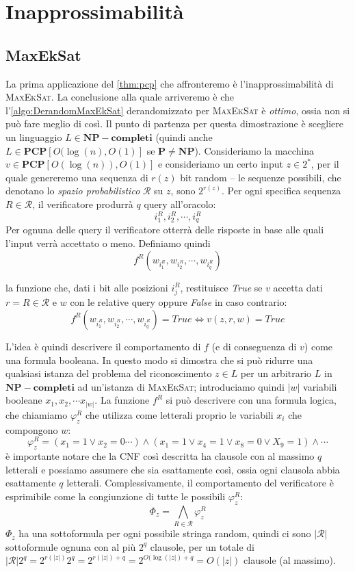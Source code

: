 \section{Inapprossimabilità}
\subsection{MaxEkSat}
La prima applicazione del \cref{thm:pcp} che affronteremo è l'inapprossimabilità di
\textsc{MaxEkSat}. La conclusione alla quale arriveremo è che l'\cref{algo:DerandomMaxEkSat} derandomizzato
per \textsc{MaxEkSat} è \textit{ottimo}, ossia non si può fare meglio di così.
Il punto di partenza per questa dimostrazione è scegliere un linguaggio
$L \in \mathbf{NP-completi}$ (quindi anche $L \in \mathbf{PCP}[O(\log(n), O(1)]$ se $\mathbf{P} \neq \mathbf{NP}$).
Consideriamo la macchina $v \in \mathbf{PCP}[O(\log(n)), O(1)]$ e consideriamo un
certo input $z \in 2^*$, per il quale genereremo una sequenza
di $r(z)$ bit random -- le sequenze possibili, che denotano lo \textit{spazio probabilistico}
$\mathcal{R}$ su $z$, sono $2^{r(z)}$.
Per ogni specifica sequenza $R \in \mathcal{R}$, il verificatore produrrà $q$ query all'oracolo:
$$
	i_{1}^R, i_{2}^R, \cdots, i_{q}^R
$$
Per ognuna delle query il verificatore otterrà delle risposte in base alle
quali l'input verrà accettato o meno. Definiamo quindi
$$
	f^R(w_{i_{1}^R}, w_{i_{2}^R}, \cdots, w_{i_{q}^R})
$$

la funzione che, dati i bit alle posizioni $i_{j}^R$, restituisce \textit{True} se $v$
accetta dati $r = R \in \mathcal{R}$ e $w$ con le relative query oppure \textit{False}
in caso contrario:
$$
	f^R(w_{i_{1}^R}, w_{i_{2}^R}, \cdots, w_{i_{q}^R}) = True \iff v(z, r, w) = True
$$

L'idea è quindi descrivere il comportamento di $f$ (e di conseguenza di $v$) come una
formula booleana. In questo modo si dimostra che si può ridurre una qualsiasi istanza
del problema del riconoscimento $z \in L$ per un arbitrario $L$ in $\mathbf{NP-completi}$
ad un'istanza di \textsc{MaxEkSat};
introduciamo quindi $|w|$ variabili booleane $x_1, x_2, \cdots x_{|w|}$.
La funzione $f^R$ si può descrivere con una formula logica, che chiamiamo
$\varphi^R_z$ che utilizza come letterali
proprio le variabili $x_i$ che compongono $w$:
$$
	\varphi^R_z = (x_1 = 1 \lor x_2 = 0 \cdots) \land (x_ 1 = 1 \lor x_4 = 1 \lor x_8 = 0 \lor X_9 = 1) \land \cdots
$$
è importante notare che la CNF così descritta ha clausole con al massimo
$q$ letterali e possiamo assumere che sia esattamente così, ossia ogni clausola
abbia esattamente $q$ letterali. Complessivamente, il comportamento del verificatore è
esprimibile come la congiunzione di tutte le possibili $\varphi^R_z$:
$$
	\Phi_z = \bigwedge_{R \in \mathcal{R}} \varphi_{z}^R
$$
$\Phi_z$ ha una sottoformula per ogni possibile stringa random, quindi ci sono
$|\mathcal{R}|$ sottoformule ognuna con al più $2^q$ clausole, per un totale di
$|\mathcal{R}|2^q = 2^{r(|z|)}2^q = 2^{r(|z|) + q} = 2^{O(\log(|z|) + q} = O(|z|)$ clausole (al massimo).

